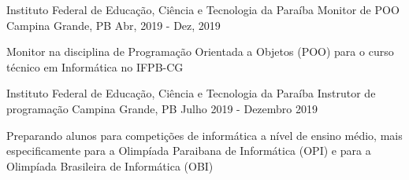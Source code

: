 \begin{cventries}
  \cventry
    {Instituto Federal de Educação, Ciência e Tecnologia da Paraíba}
    {Monitor de POO}
    {Campina Grande, PB}
    {Abr, 2019 - Dez, 2019}
    {
      \begin{cvitems}
        \item {Monitor na disciplina de Programação Orientada a Objetos (POO) para o curso técnico em Informática no IFPB-CG}
      \end{cvitems}
    }

  \cventry
    {Instituto Federal de Educação, Ciência e Tecnologia da Paraíba}
    {Instrutor de programação}
    {Campina Grande, PB}
    {Julho 2019 - Dezembro 2019}
    {
      \begin{cvitems}
        \item {Preparando alunos para competições de informática a nível de ensino médio, mais especificamente para a Olimpíada Paraibana de Informática (OPI) e para a Olimpíada Brasileira de Informática (OBI)}
      \end{cvitems}
    }
    
\end{cventries}
